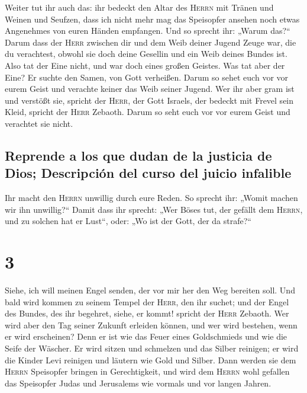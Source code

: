  Weiter tut ihr auch das: ihr bedeckt den Altar des
\textsc{Herrn} mit Tränen und Weinen und Seufzen, dass ich nicht mehr
mag das Speisopfer ansehen noch etwas Angenehmes von euren Händen
empfangen.  Und so sprecht ihr: „Warum das?{}`` Darum
dass der \textsc{Herr} zwischen dir und dem Weib deiner Jugend Zeuge
war, die du verachtest, obwohl sie doch deine Gesellin und ein Weib
deines Bundes ist.  Also tat der Eine nicht, und war doch
eines großen Geistes. Was tat aber der Eine? Er suchte den Samen, von
Gott verheißen. Darum so sehet euch vor vor eurem Geist und verachte
keiner das Weib seiner Jugend.  Wer ihr aber gram ist und
verstößt sie, spricht der \textsc{Herr}, der Gott Israels, der bedeckt
mit Frevel sein Kleid, spricht der \textsc{Herr} Zebaoth. Darum so seht
euch vor vor eurem Geist und verachtet sie nicht.

\hypertarget{reprende-a-los-que-dudan-de-la-justicia-de-dios-descripciuxf3n-del-curso-del-juicio-infalible}{%
\subsection{Reprende a los que dudan de la justicia de Dios; Descripción
del curso del juicio
infalible}\label{reprende-a-los-que-dudan-de-la-justicia-de-dios-descripciuxf3n-del-curso-del-juicio-infalible}}

 Ihr macht den \textsc{Herrn} unwillig durch eure Reden.
So sprecht ihr: „Womit machen wir ihn unwillig?{}`` Damit dass ihr
sprecht: „Wer Böses tut, der gefällt dem \textsc{Herrn}, und zu solchen
hat er Lust``, oder: „Wo ist der Gott, der da strafe?{}``

\hypertarget{section-2}{%
\section{3}\label{section-2}}

 Siehe, ich will meinen Engel senden, der vor mir her den
Weg bereiten soll. Und bald wird kommen zu seinem Tempel der
\textsc{Herr}, den ihr suchet; und der Engel des Bundes, des ihr
begehret, siehe, er kommt! spricht der \textsc{Herr} Zebaoth.
 Wer wird aber den Tag seiner Zukunft erleiden können, und
wer wird bestehen, wenn er wird erscheinen? Denn er ist wie das Feuer
eines Goldschmieds und wie die Seife der Wäscher.  Er wird
sitzen und schmelzen und das Silber reinigen; er wird die Kinder Levi
reinigen und läutern wie Gold und Silber. Dann werden sie dem
\textsc{Herrn} Speisopfer bringen in Gerechtigkeit,  und
wird dem \textsc{Herrn} wohl gefallen das Speisopfer Judas und
Jerusalems wie vormals und vor langen Jahren.

